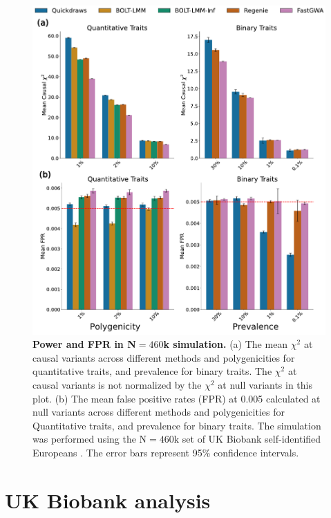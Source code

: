\begin{figure}[h]
    \centering
    \includegraphics[scale=1]{figures/qd_panel_sim2.pdf}
    \caption{\textbf{Power and FPR in N$=460$k simulation.}
    (a) The mean $\chi^2$ at causal variants across different methods and polygenicities for quantitative traits, and prevalence for binary traits. The $\chi^2$ at causal variants is not normalized by the $\chi^2$ at null variants in this plot.
    (b) The mean false positive rates (FPR) at 0.005 calculated at null variants across different methods and polygenicities for Quantitative traits, and prevalence for binary traits.
    The simulation was performed using the N$=460$k set of UK Biobank self-identified Europeans \cite{bycroft2018uk}. The error bars represent 95\% confidence intervals.
    }
    \label{fig:sim_460k}
\end{figure}

\clearpage

\section{UK Biobank analysis}
\label{sec:ch5-ukb}


